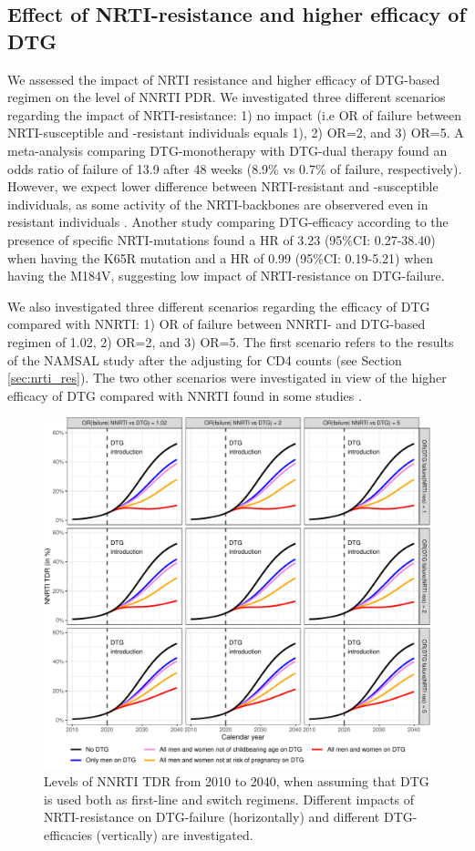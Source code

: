 \documentclass{article}
\begin{document}
\subsection{Effect of NRTI-resistance and higher efficacy of DTG}\label{sec_analysis}
We assessed the impact of NRTI resistance and higher efficacy of DTG-based regimen on the level of NNRTI PDR. We investigated three different scenarios regarding the impact of NRTI-resistance: 1) no impact (i.e OR of failure between NRTI-susceptible and -resistant individuals equals 1), 2) OR=2, and 3) OR=5. A meta-analysis comparing DTG-monotherapy with DTG-dual therapy found an odds ratio of failure of 13.9 after 48 weeks (8.9\% vs 0.7\% of failure, respectively). However, we expect lower difference between NRTI-resistant and -susceptible individuals, as some activity of the NRTI-backbones are observered even in resistant individuals \cite{Hakim2018}. Another study comparing DTG-efficacy according to the presence of specific NRTI-mutations found a HR of 3.23 (95\%CI: 0.27-38.40) when having the K65R mutation and a HR of 0.99 (95\%CI: 0.19-5.21) when having the M184V, suggesting low impact of NRTI-resistance on DTG-failure.

We also investigated three different scenarios regarding the efficacy of DTG compared with NNRTI: 1) OR of failure between NNRTI- and DTG-based regimen of 1.02, 2) OR=2, and 3) OR=5. The first scenario refers to the results of the NAMSAL study after the adjusting for CD4 counts (see Section \ref{sec:nrti_res}). The two other scenarios were investigated in view of the higher efficacy of DTG compared with NNRTI found in some studies \cite{Snedecor2019}.


\begin{figure}[h!]
\centering
   \includegraphics[width=16cm]{../figures/sens_nrti_res.pdf}
   \caption{Levels of NNRTI TDR from 2010 to 2040, when assuming that DTG is used both as  first-line and switch regimens. Different impacts of NRTI-resistance on DTG-failure (horizontally) and different DTG-efficacies (vertically) are investigated.}\label{figure2}
\end{figure}

\newpage
$ $
\newpage

\end{document}
